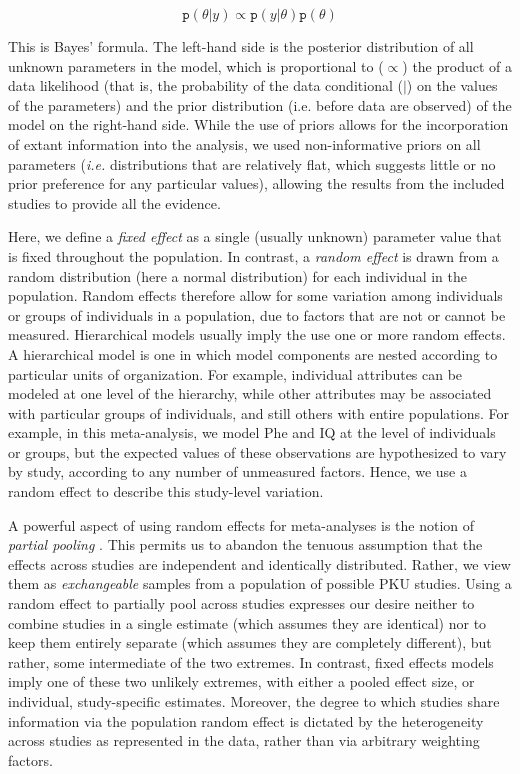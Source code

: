 \documentclass{svjour3}                     %
\begin{document}
\[ \texttt{p}(\theta | y) \propto \texttt{p}(y | \theta) \texttt{p}(\theta) \]

This is Bayes' formula. The left-hand side is the posterior distribution of all unknown parameters in the model, which is proportional to ($\propto$) the product of a data likelihood (that is, the probability of the data conditional ($|$) on the values of the parameters) and the prior distribution (i.e. before data are observed) of the model on the right-hand side. While the use of priors allows for the incorporation of extant information into the analysis, we used non-informative priors on all parameters (\emph{i.e.} distributions that are relatively flat, which suggests little or no prior preference for any particular values), allowing the results from the included studies to provide all the evidence.

Here, we define a \emph{fixed effect} as a single (usually unknown) parameter value that is fixed throughout the population. In contrast, a \emph{random effect} is drawn from a random distribution (here a normal distribution) for each individual in the population. Random effects therefore allow for some variation among individuals or groups of individuals in a population, due to factors that are not or cannot be measured. Hierarchical models usually imply the use one or more random effects. A hierarchical model is one in which model components are nested according to particular units of organization. For example, individual attributes can be modeled at one level of the hierarchy, while other attributes may be associated with particular groups of individuals, and still others with entire populations. For example, in this meta-analysis, we model Phe and IQ at the level of individuals or groups, but the expected values of these observations are hypothesized to vary by study, according to any number of unmeasured factors. Hence, we use a random effect to describe this study-level variation.

A powerful aspect of using random effects for meta-analyses is the notion of \emph{partial pooling} \citep{Gelman:2003vk}. This permits us to abandon the tenuous assumption that the effects across studies are independent and identically distributed. Rather, we view them as \emph{exchangeable} samples from a population of possible PKU studies. Using a random effect to partially pool across studies expresses our desire neither to combine studies in a single estimate (which assumes they are identical) nor to keep them entirely separate (which assumes they are completely different), but rather, some intermediate of the two extremes. In contrast, fixed effects models imply one of these two unlikely extremes, with either a pooled effect size, or individual, study-specific estimates. Moreover, the degree to which studies share information via the population random effect is dictated by the heterogeneity across studies as represented in the data, rather than via arbitrary weighting factors.
\end{document}
